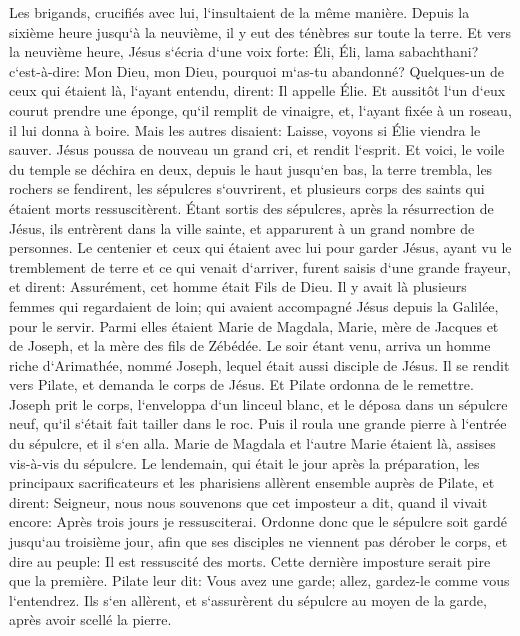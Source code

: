 \verse Les brigands, crucifiés avec lui, l`insultaient de la même manière. 
\verse Depuis la sixième heure jusqu`à la neuvième, il y eut des ténèbres sur toute la terre. 
\verse Et vers la neuvième heure, Jésus s`écria d`une voix forte: Éli, Éli, lama sabachthani? c`est-à-dire: Mon Dieu, mon Dieu, pourquoi m`as-tu abandonné? 
\verse Quelques-un de ceux qui étaient là, l`ayant entendu, dirent: Il appelle Élie. 
\verse Et aussitôt l`un d`eux courut prendre une éponge, qu`il remplit de vinaigre, et, l`ayant fixée à un roseau, il lui donna à boire. 
\verse Mais les autres disaient: Laisse, voyons si Élie viendra le sauver. 
\verse Jésus poussa de nouveau un grand cri, et rendit l`esprit. 
\verse Et voici, le voile du temple se déchira en deux, depuis le haut jusqu`en bas, la terre trembla, les rochers se fendirent, 
\verse les sépulcres s`ouvrirent, et plusieurs corps des saints qui étaient morts ressuscitèrent. 
\verse Étant sortis des sépulcres, après la résurrection de Jésus, ils entrèrent dans la ville sainte, et apparurent à un grand nombre de personnes. 
\verse Le centenier et ceux qui étaient avec lui pour garder Jésus, ayant vu le tremblement de terre et ce qui venait d`arriver, furent saisis d`une grande frayeur, et dirent: Assurément, cet homme était Fils de Dieu. 
\verse Il y avait là plusieurs femmes qui regardaient de loin; qui avaient accompagné Jésus depuis la Galilée, pour le servir. 
\verse Parmi elles étaient Marie de Magdala, Marie, mère de Jacques et de Joseph, et la mère des fils de Zébédée. 
\verse Le soir étant venu, arriva un homme riche d`Arimathée, nommé Joseph, lequel était aussi disciple de Jésus. 
\verse Il se rendit vers Pilate, et demanda le corps de Jésus. Et Pilate ordonna de le remettre. 
\verse Joseph prit le corps, l`enveloppa d`un linceul blanc, 
\verse et le déposa dans un sépulcre neuf, qu`il s`était fait tailler dans le roc. Puis il roula une grande pierre à l`entrée du sépulcre, et il s`en alla. 
\verse Marie de Magdala et l`autre Marie étaient là, assises vis-à-vis du sépulcre. 
\verse Le lendemain, qui était le jour après la préparation, les principaux sacrificateurs et les pharisiens allèrent ensemble auprès de Pilate, 
\verse et dirent: Seigneur, nous nous souvenons que cet imposteur a dit, quand il vivait encore: Après trois jours je ressusciterai. 
\verse Ordonne donc que le sépulcre soit gardé jusqu`au troisième jour, afin que ses disciples ne viennent pas dérober le corps, et dire au peuple: Il est ressuscité des morts. Cette dernière imposture serait pire que la première. 
\verse Pilate leur dit: Vous avez une garde; allez, gardez-le comme vous l`entendrez. 
\verse Ils s`en allèrent, et s`assurèrent du sépulcre au moyen de la garde, après avoir scellé la pierre. 

